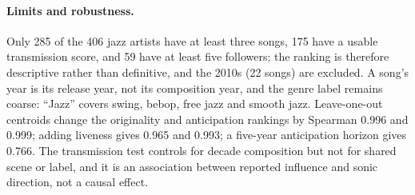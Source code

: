 \paragraph{Limits and robustness.}
Only 285 of the 406 jazz artists have at least three songs, 175 have a usable
transmission score, and 59 have at least five followers; the ranking is therefore
descriptive rather than definitive, and the 2010s (22 songs) are excluded. A song's
year is its release year, not its composition year, and the genre label remains coarse:
``Jazz'' covers swing, bebop, free jazz and smooth jazz. Leave-one-out centroids change the
originality and anticipation rankings by Spearman 0.996 and 0.999; adding liveness gives
0.965 and 0.993; a five-year anticipation horizon gives 0.766. The transmission test
controls for decade composition but not for shared scene or label, and it is an
association between reported influence and sonic direction, not a causal effect.
